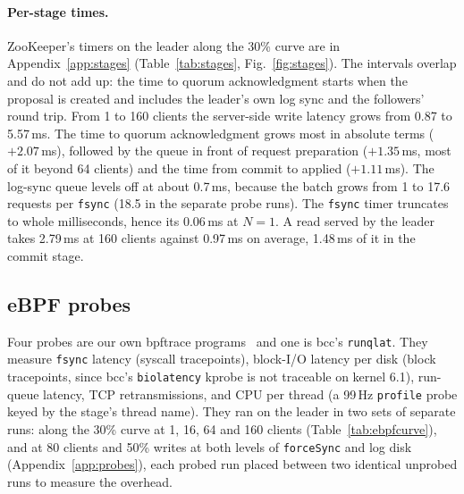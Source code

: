 \documentclass{llncs}
\begin{document}
\paragraph{Per-stage times.} ZooKeeper's timers on the leader along the 30\% curve are in Appendix~\ref{app:stages} (Table~\ref{tab:stages}, Fig.~\ref{fig:stages}). The intervals overlap and do not add up: the time to quorum acknowledgment starts when the proposal is created and includes the leader's own log sync and the followers' round trip. From 1 to 160 clients the server-side write latency grows from 0.87 to 5.57\,ms. The time to quorum acknowledgment grows most in absolute terms ($+2.07$\,ms), followed by the queue in front of request preparation ($+1.35$\,ms, most of it beyond 64 clients) and the time from commit to applied ($+1.11$\,ms). The log-sync queue levels off at about 0.7\,ms, because the batch grows from 1 to 17.6 requests per \texttt{fsync} (18.5 in the separate probe runs). The \texttt{fsync} timer truncates to whole milliseconds, hence its 0.06\,ms at $N=1$. A read served by the leader takes 2.79\,ms at 160 clients against 0.97\,ms on average, 1.48\,ms of it in the commit stage.


\subsection{eBPF probes}
\label{sec:ebpf}

Four probes are our own bpftrace programs~\cite{gregg_bpf} and one is bcc's \texttt{runqlat}. They measure \texttt{fsync} latency (syscall tracepoints), block-I/O latency per disk (block tracepoints, since bcc's \texttt{biolatency} kprobe is not traceable on kernel 6.1), run-queue latency, TCP retransmissions, and CPU per thread (a 99\,Hz \texttt{profile} probe keyed by the stage's thread name). They ran on the leader in two sets of separate runs: along the 30\% curve at 1, 16, 64 and 160 clients (Table~\ref{tab:ebpfcurve}), and at 80 clients and 50\% writes at both levels of \texttt{forceSync} and log disk (Appendix~\ref{app:probes}), each probed run placed between two identical unprobed runs to measure the overhead.

\begin{table}[t]
  \centering
  \caption{Probes along the 30\% curve: throughput, ZooKeeper's counters and the leader's CPU per thread.}
  \label{tab:ebpfcurve}
  \scriptsize
  
\end{table}
\end{document}
